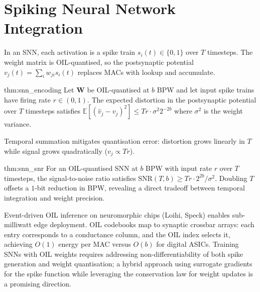 \section{Spiking Neural Network Integration}
\label{sec:snn_integration}
In an SNN, each activation is a spike train $s_i(t) \in \{0, 1\}$ over $T$
timesteps. The weight matrix is OIL-quantised, so the postsynaptic potential
$v_j(t) = \sum_i w_{ji} s_i(t)$ replaces MACs with lookup and accumulate.
\begin{mythm}{thm:snn_encoding}
Let $\mathbf{W}$ be OIL-quantised at $b$ BPW and let input spike trains
have firing rate $r \in (0, 1)$. The expected distortion in the
postsynaptic potential over $T$ timesteps satisfies $\mathbb{E}[(\hat{v}_j -
v_j)^2] \leq T r \cdot \sigma^2 2^{-2b}$ where $\sigma^2$ is the weight
variance.
\end{mythm}
Temporal summation mitigates quantisation error: distortion grows linearly
in $T$ while signal grows quadratically ($v_j \propto T r$).
\begin{mythm}{thm:snn_snr}
For an OIL-quantised SNN at $b$ BPW with input rate $r$ over $T$ timesteps,
the signal-to-noise ratio satisfies $\text{SNR}(T, b) \geq
T r \cdot 2^{2b} / \sigma^2$. Doubling $T$ offsets a $1$-bit reduction in
BPW, revealing a direct tradeoff between temporal integration and weight
precision.
\end{mythm}
Event-driven OIL inference on neuromorphic chips (Loihi, Speck) enables
sub-milliwatt edge deployment. OIL codebooks map to synaptic crossbar
arrays: each entry corresponds to a conductance column, and the OIL index
selects it, achieving $O(1)$ energy per MAC versus $O(b)$ for digital ASICs.
Training SNNs with OIL weights requires addressing non-differentiability of
both spike generation and weight quantisation; a hybrid approach using
surrogate gradients for the spike function while leveraging the conservation
law for weight updates is a promising direction.

